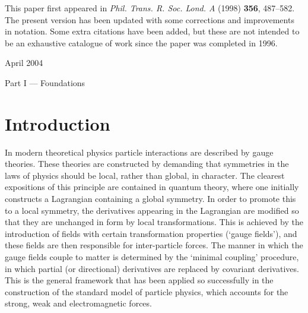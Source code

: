 \documentclass[a4paper]{article}
\numberwithin{equation}{section}
\begin{document}
\newpage



\noindent
This paper first appeared in \textit{Phil.\/ Trans.\/ R.\/ Soc.\/ Lond.\/ A}
(1998) \textbf{356}, 487--582.  The present version has been updated
with some corrections and improvements in notation.  Some extra
citations have been added, but these are not intended to be an
exhaustive catalogue of work since the paper was completed in 1996.

\vspace{0.5cm}

\noindent
April 2004


\tableofcontents

\newpage



\vspace*{5cm}
\begin{center}
{\LARGE Part I --- Foundations}
\end{center}

\newpage


\section{Introduction} \label{Intro}

In modern theoretical physics particle interactions are described by
gauge theories.  These theories are constructed by demanding that
symmetries in the laws of physics should be local, rather than global,
in character.  The clearest expositions of this principle are
contained in quantum theory, where one initially constructs a
Lagrangian containing a global symmetry.  In order to promote this to
a local symmetry, the derivatives appearing in the Lagrangian are
modified so that they are unchanged in form by local transformations.
This is achieved by the introduction of fields with certain
transformation properties (`gauge fields'), and these fields are then
responsible for inter-particle forces.  The manner in which the gauge
fields couple to matter is determined by the `minimal coupling'
procedure, in which partial (or directional) derivatives are replaced
by covariant derivatives.  This is the general framework that has been
applied so successfully in the construction of the standard model of
particle physics, which accounts for the strong, weak and
electromagnetic forces.
\end{document}
